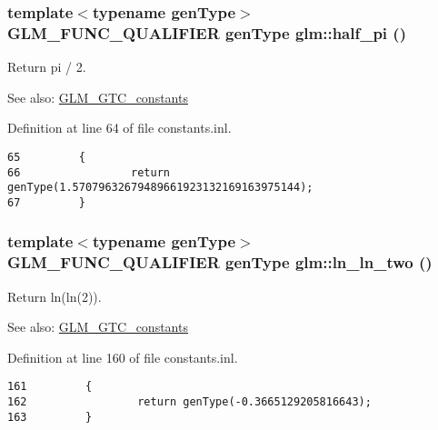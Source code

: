 \hypertarget{group__gtc__constants_gac1d3ec09335dd506ecc76a0097db220}{
\subsubsection[half\_\-pi]{\setlength{\rightskip}{0pt plus 5cm}template$<$typename genType$>$ GLM\_\-FUNC\_\-QUALIFIER genType glm::half\_\-pi ()}}
\label{group__gtc__constants_gac1d3ec09335dd506ecc76a0097db220}


Return pi / 2. \begin{Desc}
\item[See also:]\hyperlink{group__gtc__constants}{GLM\_\-GTC\_\-constants} \end{Desc}


Definition at line 64 of file constants.inl.

\begin{Code}\begin{verbatim}65         {
66                 return genType(1.57079632679489661923132169163975144);
67         }
\end{verbatim}
\end{Code}


\hypertarget{group__gtc__constants_g938ac709f33297c1324ca30866f3d9a5}{
\subsubsection[ln\_\-ln\_\-two]{\setlength{\rightskip}{0pt plus 5cm}template$<$typename genType$>$ GLM\_\-FUNC\_\-QUALIFIER genType glm::ln\_\-ln\_\-two ()}}
\label{group__gtc__constants_g938ac709f33297c1324ca30866f3d9a5}


Return ln(ln(2)). \begin{Desc}
\item[See also:]\hyperlink{group__gtc__constants}{GLM\_\-GTC\_\-constants} \end{Desc}


Definition at line 160 of file constants.inl.

\begin{Code}\begin{verbatim}161         {
162                 return genType(-0.3665129205816643);
163         }
\end{verbatim}
\end{Code}


